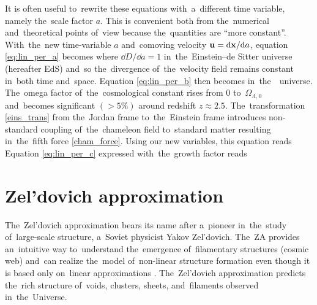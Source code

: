 It is often useful to~rewrite these equations with~a~different time variable, namely the~scale factor $a$. This is convenient both from the~numerical and~theoretical points of~view because the~quantities are ``more constant''. With~the~new time-variable $a$ and~comoving velocity $\mathbf u = \mbox{d} \mathbf x/\mbox{d} a$, equation \eqref{eq:lin_per_a} becomes
where $\dd D/\dd a = 1$ in~the~Einstein--de Sitter universe (hereafter EdS) and~so the~divergence of~the~velocity field remains constant in~both time and~space. Equation \eqref{eq:lin_per_b} then becomes
in~the~\LCDM\ universe. The~omega factor of~the~cosmological constant
rises from $0$ to~$\Omega_{\Lambda,0}$ and~becomes significant $(>5\%)$ around redshift $z\approx2.5$. The~transformation \eqref{eins_trans} from the~Jordan frame to~the~Einstein frame introduces non-standard coupling of~the~chameleon field to~standard matter resulting in~the~fifth force \eqref{cham_force}. Using our new variables, this equation reads
Equation \eqref{eq:lin_per_c} expressed with~the~growth factor reads
\section{Zel'dovich approximation}
The~Zel'dovich approximation \parencite[hereafter ZA;][]{1970A&A.....5...84Z} bears its name after a~pioneer in~the~study of~large-scale structure, a~Soviet physicist Yakov Zel'dovich. The~ZA provides an~intuitive way to~understand the~emergence of~filamentary structures (cosmic web) and~can realize the~model of~non-linear structure formation even though it is based only on~linear approximations \parencite{2014MNRAS.439.3630W}. The~Zel’dovich approximation predicts the~rich structure of~voids, clusters, sheets, and~filaments observed in~the~Universe.

